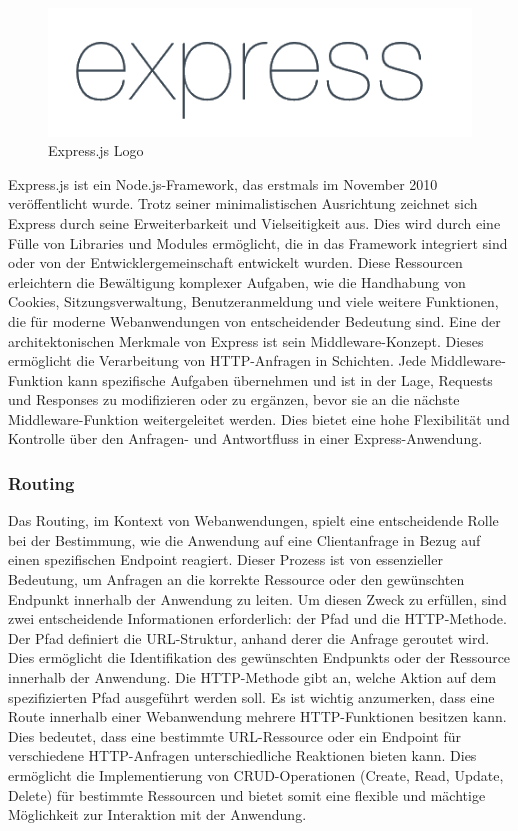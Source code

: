 \begin{figure}[h!]
    \centering
    \includegraphics[width=0.8\linewidth]{pics/express_logo.png}
    \caption{Express.js Logo}
    \label{fig:enter-label}
\end{figure}
Express.js ist ein Node.js-Framework, das erstmals im November 2010 veröffentlicht wurde. Trotz seiner minimalistischen Ausrichtung zeichnet sich Express durch seine Erweiterbarkeit und Vielseitigkeit aus. Dies wird durch eine Fülle von Libraries und Modules ermöglicht, die in das Framework integriert sind oder von der Entwicklergemeinschaft entwickelt wurden. Diese Ressourcen erleichtern die Bewältigung komplexer Aufgaben, wie die Handhabung von Cookies, Sitzungsverwaltung, Benutzeranmeldung und viele weitere Funktionen, die für moderne Webanwendungen von entscheidender Bedeutung sind.
\newline
Eine der architektonischen Merkmale von Express ist sein Middleware-Konzept. Dieses ermöglicht die Verarbeitung von HTTP-Anfragen in Schichten. Jede Middleware-Funktion kann spezifische Aufgaben übernehmen und ist in der Lage, Requests und Responses zu modifizieren oder zu ergänzen, bevor sie an die nächste Middleware-Funktion weitergeleitet werden. Dies bietet eine hohe Flexibilität und Kontrolle über den Anfragen- und Antwortfluss in einer Express-Anwendung.
\cite{Express_js_Introduction}

\subsubsection{Routing}
Das Routing, im Kontext von Webanwendungen, spielt eine entscheidende Rolle bei der Bestimmung, wie die Anwendung auf eine Clientanfrage in Bezug auf einen spezifischen Endpoint reagiert. Dieser Prozess ist von essenzieller Bedeutung, um Anfragen an die korrekte Ressource oder den gewünschten Endpunkt innerhalb der Anwendung zu leiten. Um diesen Zweck zu erfüllen, sind zwei entscheidende Informationen erforderlich: der Pfad und die HTTP-Methode.
\newline
Der Pfad definiert die URL-Struktur, anhand derer die Anfrage geroutet wird. Dies ermöglicht die Identifikation des gewünschten Endpunkts oder der Ressource innerhalb der Anwendung. Die HTTP-Methode gibt an, welche Aktion auf dem spezifizierten Pfad ausgeführt werden soll. Es ist wichtig anzumerken, dass eine Route innerhalb einer Webanwendung mehrere HTTP-Funktionen besitzen kann. Dies bedeutet, dass eine bestimmte URL-Ressource oder ein Endpoint für verschiedene HTTP-Anfragen unterschiedliche Reaktionen bieten kann. Dies ermöglicht die Implementierung von CRUD-Operationen (Create, Read, Update, Delete) für bestimmte Ressourcen und bietet somit eine flexible und mächtige Möglichkeit zur Interaktion mit der Anwendung.
\cite{Express_js_basic_routing}
\cite{Express_js_routing}

